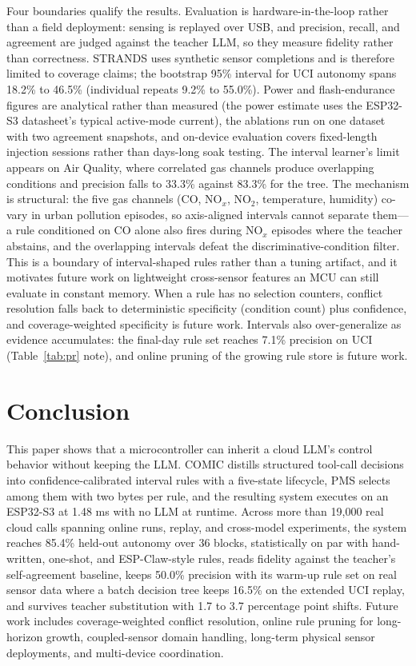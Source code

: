 \documentclass[11pt,a4paper]{article}
\begin{document}
Four boundaries qualify the results. Evaluation is hardware-in-the-loop
rather than a field deployment: sensing is replayed over USB, and precision,
recall, and agreement are judged against the teacher LLM, so they measure
fidelity rather than correctness. STRANDS uses synthetic sensor completions
and is therefore limited to coverage claims; the bootstrap 95\% interval for
UCI autonomy spans 18.2\% to 46.5\% (individual repeats 9.2\% to 55.0\%).
Power and flash-endurance figures are analytical rather than measured (the
power estimate uses the ESP32-S3 datasheet's typical active-mode current),
the ablations run on one dataset with two agreement snapshots, and on-device
evaluation covers fixed-length injection sessions rather than days-long soak
testing. The interval learner's limit appears on Air Quality, where
correlated gas channels produce overlapping conditions and precision falls to
33.3\% against 83.3\% for the tree. The mechanism is structural: the five gas
channels (CO, NO$_x$, NO$_2$, temperature, humidity) co-vary in urban
pollution episodes, so axis-aligned intervals cannot separate them---a rule
conditioned on CO alone also fires during NO$_x$ episodes where the teacher
abstains, and the overlapping intervals defeat the discriminative-condition
filter. This is a boundary of interval-shaped rules rather than a tuning
artifact, and it motivates future work on lightweight cross-sensor features
an MCU can still evaluate in constant memory.
When a rule has no selection counters, conflict resolution falls back to
deterministic specificity (condition count) plus confidence, and
coverage-weighted specificity is future work. Intervals also over-generalize
as evidence accumulates: the final-day rule set reaches 7.1\% precision on
UCI (Table~\ref{tab:pr} note), and online pruning of the growing rule store
is future work.

\section{Conclusion}

This paper shows that a microcontroller can inherit a cloud LLM's control
behavior without keeping the LLM. COMIC distills structured tool-call
decisions into confidence-calibrated interval rules with a five-state
lifecycle, PMS selects among them with two bytes per rule, and the resulting
system executes on an ESP32-S3 at 1.48 ms with no LLM at runtime. Across more
than 19,000 real cloud calls spanning online runs, replay, and cross-model
experiments, the system reaches 85.4\% held-out autonomy over 36 blocks,
statistically on par with hand-written, one-shot, and ESP-Claw-style rules,
reads fidelity against the teacher's self-agreement baseline, keeps 50.0\%
precision with its warm-up rule set on real sensor data where a batch
decision tree keeps 16.5\% on the extended UCI replay, and survives teacher
substitution with 1.7 to 3.7 percentage point shifts. Future work includes
coverage-weighted conflict resolution, online rule pruning for long-horizon
growth, coupled-sensor domain handling, long-term physical sensor
deployments, and multi-device coordination.
\end{document}
